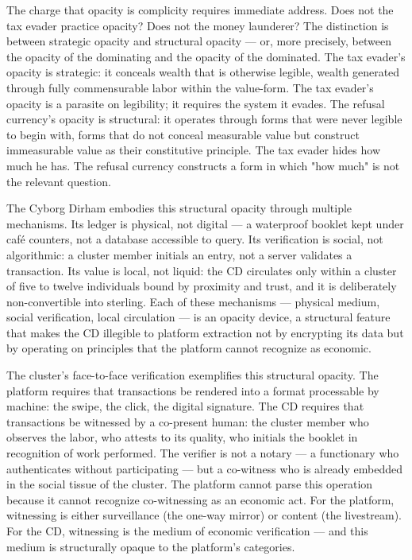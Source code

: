 The charge that opacity is complicity requires immediate address. Does not the tax evader practice opacity? Does not the money launderer? The distinction is between strategic opacity and structural opacity — or, more precisely, between the opacity of the dominating and the opacity of the dominated. The tax evader's opacity is strategic: it conceals wealth that is otherwise legible, wealth generated through fully commensurable labor within the value-form. The tax evader's opacity is a parasite on legibility; it requires the system it evades. The refusal currency's opacity is structural: it operates through forms that were never legible to begin with, forms that do not conceal measurable value but construct immeasurable value as their constitutive principle. The tax evader hides how much he has. The refusal currency constructs a form in which "how much" is not the relevant question.

The Cyborg Dirham embodies this structural opacity through multiple mechanisms. Its ledger is physical, not digital — a waterproof booklet kept under café counters, not a database accessible to query. Its verification is social, not algorithmic: a cluster member initials an entry, not a server validates a transaction. Its value is local, not liquid: the CD circulates only within a cluster of five to twelve individuals bound by proximity and trust, and it is deliberately non-convertible into sterling. Each of these mechanisms — physical medium, social verification, local circulation — is an opacity device, a structural feature that makes the CD illegible to platform extraction not by encrypting its data but by operating on principles that the platform cannot recognize as economic.

The cluster's face-to-face verification exemplifies this structural opacity. The platform requires that transactions be rendered into a format processable by machine: the swipe, the click, the digital signature. The CD requires that transactions be witnessed by a co-present human: the cluster member who observes the labor, who attests to its quality, who initials the booklet in recognition of work performed. The verifier is not a notary — a functionary who authenticates without participating — but a co-witness who is already embedded in the social tissue of the cluster. The platform cannot parse this operation because it cannot recognize co-witnessing as an economic act. For the platform, witnessing is either surveillance (the one-way mirror) or content (the livestream). For the CD, witnessing is the medium of economic verification — and this medium is structurally opaque to the platform's categories.

